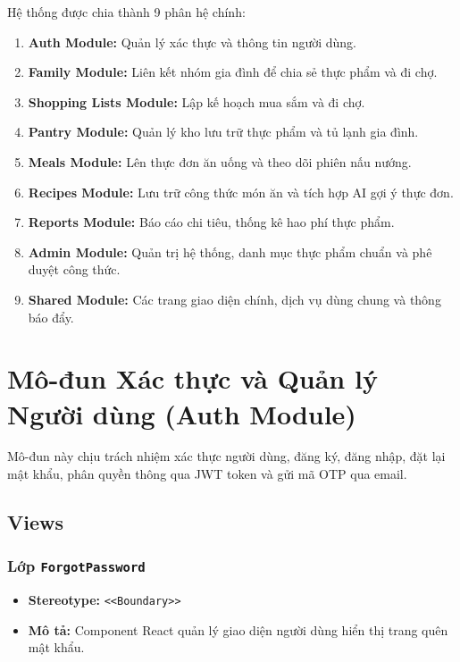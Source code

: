 \documentclass[12pt,a4paper]{article}
\begin{document}
Hệ thống được chia thành 9 phân hệ chính:
\begin{enumerate}
    \item \textbf{Auth Module:} Quản lý xác thực và thông tin người dùng.
    \item \textbf{Family Module:} Liên kết nhóm gia đình để chia sẻ thực phẩm và đi chợ.
    \item \textbf{Shopping Lists Module:} Lập kế hoạch mua sắm và đi chợ.
    \item \textbf{Pantry Module:} Quản lý kho lưu trữ thực phẩm và tủ lạnh gia đình.
    \item \textbf{Meals Module:} Lên thực đơn ăn uống và theo dõi phiên nấu nướng.
    \item \textbf{Recipes Module:} Lưu trữ công thức món ăn và tích hợp AI gợi ý thực đơn.
    \item \textbf{Reports Module:} Báo cáo chi tiêu, thống kê hao phí thực phẩm.
    \item \textbf{Admin Module:} Quản trị hệ thống, danh mục thực phẩm chuẩn và phê duyệt công thức.
    \item \textbf{Shared Module:} Các trang giao diện chính, dịch vụ dùng chung và thông báo đẩy.
\end{enumerate}

\newpage
\section{Mô-đun Xác thực và Quản lý Người dùng (Auth Module)}


Mô-đun này chịu trách nhiệm xác thực người dùng, đăng ký, đăng nhập, đặt lại mật khẩu, phân quyền thông qua JWT token và gửi mã OTP qua email.

\subsection{Views}


\subsubsection{Lớp \texttt{ForgotPassword}}

\begin{itemize}[leftmargin=*]
    \item \textbf{Stereotype:} \texttt{\textless{}\textless{}Boundary\textgreater{}\textgreater{}}
    \item \textbf{Mô tả:} Component React quản lý giao diện người dùng hiển thị trang quên mật khẩu.
\end{itemize}
\end{document}
